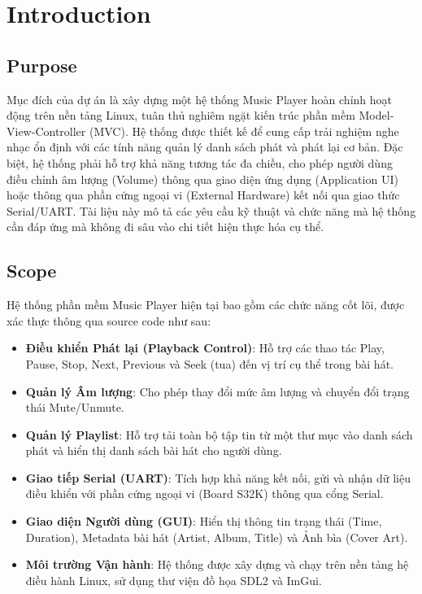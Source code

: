 \documentclass{article}
\begin{document}
\section{Introduction}

\subsection{Purpose}
Mục đích của dự án là xây dựng một hệ thống Music Player hoàn chỉnh hoạt động trên nền tảng Linux, tuân thủ nghiêm ngặt kiến trúc phần mềm Model-View-Controller (MVC). Hệ thống được thiết kế để cung cấp trải nghiệm nghe nhạc ổn định với các tính năng quản lý danh sách phát và phát lại cơ bản. Đặc biệt, hệ thống phải hỗ trợ khả năng tương tác đa chiều, cho phép người dùng điều chỉnh âm lượng (Volume) thông qua giao diện ứng dụng (Application UI) hoặc thông qua phần cứng ngoại vi (External Hardware) kết nối qua giao thức Serial/UART. Tài liệu này mô tả các yêu cầu kỹ thuật và chức năng mà hệ thống cần đáp ứng mà không đi sâu vào chi tiết hiện thực hóa cụ thể.

\subsection{Scope}
Hệ thống phần mềm Music Player hiện tại bao gồm các chức năng cốt lõi, được xác thực thông qua source code như sau:
\begin{itemize}
    \item \textbf{Điều khiển Phát lại (Playback Control)}: Hỗ trợ các thao tác Play, Pause, Stop, Next, Previous và Seek (tua) đến vị trí cụ thể trong bài hát.
    \item \textbf{Quản lý Âm lượng}: Cho phép thay đổi mức âm lượng và chuyển đổi trạng thái Mute/Unmute.
    \item \textbf{Quản lý Playlist}: Hỗ trợ tải toàn bộ tập tin từ một thư mục vào danh sách phát và hiển thị danh sách bài hát cho người dùng.
    \item \textbf{Giao tiếp Serial (UART)}: Tích hợp khả năng kết nối, gửi và nhận dữ liệu điều khiển với phần cứng ngoại vi (Board S32K) thông qua cổng Serial.
    \item \textbf{Giao diện Người dùng (GUI)}: Hiển thị thông tin trạng thái (Time, Duration), Metadata bài hát (Artist, Album, Title) và Ảnh bìa (Cover Art).
    \item \textbf{Môi trường Vận hành}: Hệ thống được xây dựng và chạy trên nền tảng hệ điều hành Linux, sử dụng thư viện đồ họa SDL2 và ImGui.
\end{itemize}
\end{document}
